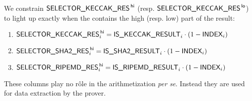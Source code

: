 We constrain $\textsf{SELECTOR\_KECCAK\_RES}^{\mathsf{\,hi}}$ (resp. $\textsf{SELECTOR\_KECCAK\_RES}^{\mathsf{\,lo}}$) to light up exactly when the \limb{} contains the high (resp. low) part of the  result:
\begin{enumerate}
	\item $\textsf{SELECTOR\_KECCAK\_RES}^{\mathsf{\,hi}}_{i} = \textsf{IS\_KECCAK\_RESULT}_{i} \cdot (1 - \textsf{INDEX}_{i})$
	\item $\textsf{SELECTOR\_SHA2\_RES}^{\mathsf{\,hi}}_{i} = \textsf{IS\_SHA2\_RESULT}_{i} \cdot (1 - \textsf{INDEX}_{i})$
	\item $\textsf{SELECTOR\_RIPEMD\_RES}^{\mathsf{\,hi}}_{i} = \textsf{IS\_RIPEMD\_RESULT}_{i} \cdot (1 - \textsf{INDEX}_{i})$
\end{enumerate}
\saNote{} These columns play no rôle in the arithmetization \emph{per se}.
Instead they are used for data extraction by the prover.
